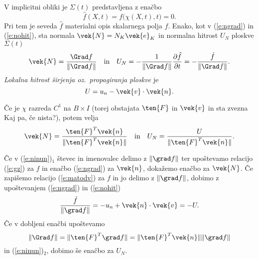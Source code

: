 V implicitni obliki je $\Sigma(t)$ predstavljena z enačbo
\[
	\hat{f}(X,t)=f\big(\chi(X,t),t\big)=0.
\]
Pri tem je seveda $\hat{f}$ materialni opis skalarnega polja $f$.
Enako, kot v (\ref{e:ngrad}) in (\ref{e:nohit}), sta
normala $\vek{N}=N_K\vek{e}_K$ in normalna hitrost $U_N$ ploskve $\Sigma(t)$
\begin{equation} \label{e:ninun}
	\vek{N}=\frac{\Grad f}{\|\Grad f\|}\quad\textrm{in}
	\quad U_N=-\frac{1}{\|\Grad f\|}\frac{\partial \hat{f}}{\partial t}
	=-\frac{\dot{f}}{\|\Grad f\|}.
\end{equation}
\emph{Lokalna hitrost širjenja oz.~propagiranja ploskve} je
\[ U=u_n-\vek{v}\cdot\vek{n}. \]
\begin{trditev}
	Če je $\chi$ razreda $C^1$ na $B\times I$ (torej obstajata $\ten{F}$ in $\vek{v}$
	in sta zvezna {\color[rgb]{1,0,0} Kaj pa, če nista?}), potem velja
	\begin{equation}
		\vek{N}=\frac{\ten{F}^{T}\vek{n}}{\|\ten{F}^{T}\vek{n}\|}\quad\textrm{in}
		\quad U_N=\frac{U}{\|\ten{F}^{T}\vek{n}\|}.
	\end{equation} 
\end{trditev}
\proof
	Če v (\ref{e:ninun})$_1$ števec in imenovalec delimo z $\|\grad f\|$ ter
	upoštevamo relacijo (\ref{e:gz}) za $f$ in enačbo (\ref{e:ngrad}) za $\vek{n}$,
	dokažemo enačbo za $\vek{N}$. Če zapišemo relacijo (\ref{e:matodv}) za $f$ in
	jo delimo z $\|\grad f\|$, dobimo z upoštevanjem (\ref{e:ngrad}) in (\ref{e:nohit})
	\[
		\frac{\dot{f}}{\|\grad f\|}=-u_n+\vek{n}\cdot\vek{v}=-U.
	\]
	Če v dobljeni enačbi upoštevamo
	\[
		\|\Grad f\|=\|\ten{F}^{T}\grad f\|=\|\ten{F}^{T}\vek{n}\|\|\grad f\|
	\]
	in (\ref{e:ninun})$_2$, dobimo še enačbo za $U_N$.
\endproof

